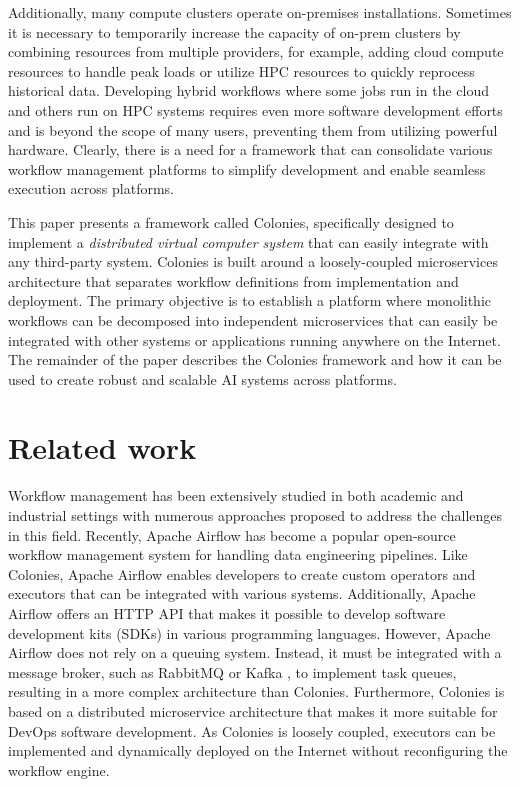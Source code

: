 \documentclass{article}
\begin{document}
Additionally, many compute clusters operate on-premises installations. Sometimes it is necessary to temporarily increase the capacity of on-prem clusters by combining resources from multiple providers, for example, adding cloud compute resources to handle peak loads or utilize HPC resources to quickly reprocess historical data. Developing hybrid workflows where some jobs run in the cloud and others run on HPC systems requires even more software development efforts \cite{wf_challenges} and is beyond the scope of many users, preventing them from utilizing powerful hardware. Clearly, there is a need for a framework that can consolidate various workflow management platforms to simplify development and enable seamless execution across platforms.

This paper presents a framework called Colonies, specifically designed to implement a \emph{distributed virtual computer system} that can easily integrate with any third-party system. Colonies is built around a loosely-coupled microservices architecture that separates workflow definitions from implementation and deployment. The primary objective is to establish a platform where monolithic workflows can be decomposed into independent microservices that can easily be integrated with other systems or applications running anywhere on the Internet. The remainder of the paper describes the Colonies framework and how it can be used to create robust and scalable AI systems across platforms. 

\section{Related work}
Workflow management has been extensively studied in both academic and industrial settings with numerous approaches \cite{service_wfs, schmitt2022workflow, GarciaRepresa1740746, Ouyang2010, NIKOLOV2021100440, workflow_in_bigdata} proposed to address the challenges in this field. Recently, Apache Airflow \cite{apache_airflow} has become a popular open-source workflow management system for handling data engineering pipelines. Like Colonies, Apache Airflow enables developers to create custom operators and executors that can be integrated with various systems. Additionally, Apache Airflow offers an HTTP API that makes it possible to develop software development kits (SDKs) in various programming languages. However, Apache Airflow does not rely on a queuing system. Instead, it must be integrated with a message broker, such as RabbitMQ \cite{rabbitmq} or Kafka \cite{apache_kafka}, to implement task queues, resulting in a more complex architecture than Colonies. Furthermore, Colonies is based on a distributed microservice architecture that makes it more suitable for DevOps software development. As Colonies is loosely coupled, executors can be implemented and dynamically deployed on the Internet without reconfiguring the workflow engine.
\end{document}
